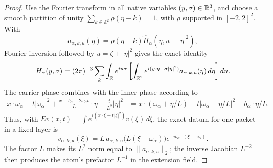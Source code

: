 \begin{proof}
Use the Fourier transform in all native variables $(y,\sigma)\in\mathbb R^3$,
and choose a smooth partition of unity
$\sum_{k\in\mathbb Z^2}\rho(\eta-k)=1$, with $\rho$ supported in
$[-2,2]^2$.  With
\[
 a_{\alpha,k,u}(\eta)
   =\rho(\eta-k)\widehat H_\alpha(\eta,u-|\eta|^2),
\]
Fourier inversion followed by $u=\zeta+|\eta|^2$ gives the exact identity
\begin{equation}\label{eq:sparse-native-layers}
 H_\alpha(y,\sigma)
   =(2\pi)^{-3}\sum_k\int_\mathbb R e^{iu\sigma}
       \left[\int_{\mathbb R^2}
          e^{i(y\cdot\eta-\sigma|\eta|^2)}
          a_{\alpha,k,u}(\eta)\,d\eta\right]du.
\end{equation}
The carrier phase combines with the inner phase according to
\begin{align}
 x\cdot\omega_\alpha-t|\omega_\alpha|^2
  +\frac{x-b_\alpha-2\omega_\alpha t}{L}\cdot\eta
  -\frac{t}{L^2}|\eta|^2
   & =x\cdot(\omega_\alpha+\eta/L)
       -t|\omega_\alpha+\eta/L|^2
       -b_\alpha\cdot\eta/L.
       \label{eq:sparse-exact-phase}
\end{align}
Thus, with $Ev(x,t)=\int e^{i(x\cdot\xi-t|\xi|^2)}v(\xi)\,d\xi$,
the exact datum for one packet in a fixed layer is
\begin{equation}\label{eq:sparse-layer-datum}
 v_{\alpha,k,u}(\xi)
   = L\,a_{\alpha,k,u}\bigl(L(\xi-\omega_\alpha)\bigr)
         e^{-ib_\alpha\cdot(\xi-\omega_\alpha)}.
\end{equation}
The factor $L$ makes its $L^2$ norm equal to
$\|a_{\alpha,k,u}\|_2$; the inverse Jacobian $L^{-2}$ then produces
the atom's prefactor $L^{-1}$ in the extension field.


\end{proof}
